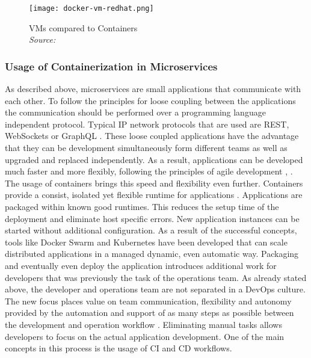 \documentclass[12pt, a4paper]{article}
\begin{document}
        \begin{figure}
            \centering
            \texttt{[image: docker-vm-redhat.png]}
            \caption{\ac{VM}s compared to Containers \\\textit{Source:~\cite{redhat_pic}}}\label{fig::vm_docker}
        \end{figure}

        \subsubsection{Usage of Containerization in Microservices}
        As described above, microservices are small applications that communicate with each other. To follow the principles for loose coupling between the applications the communication should be performed over a programming language independent protocol. Typical \acs{IP} network protocols that are used are \ac{REST}, WebSockets or GraphQL \cite{micro}. These loose coupled applications have the advantage that they can be development simultaneously form different teams as well as upgraded and replaced independently. As a result, applications can be developed much faster and more flexibly, following the principles of agile development \cite{micro}, \cite{redhat_micro}.\newline
        The usage of containers brings this speed and flexibility even further. Containers provide a consist, isolated yet flexible runtime for applications \cite{micro_container}. Applications are packaged within known good runtimes. This reduces the setup time of the deployment and eliminate host specific errors. New application instances can be started without additional configuration. As a result of the successful concepts, tools like Docker Swarm and Kubernetes have been developed that can scale distributed applications in a managed dynamic, even automatic way.\newline
        \noindent Packaging and eventually even deploy the application introduces additional work for developers that was previously the task of the operations team. As already stated above, the developer and operations team are not separated in a DevOps culture. The new focus places value on team communication, flexibility and autonomy provided by the automation and support of as many steps as possible between the development and operation workflow \cite{effective_devops}. Eliminating manual tasks allows developers to focus on the actual application development. One of the main concepts in this process is the usage of \ac{CI} and \ac{CD} workflows.
\end{document}
